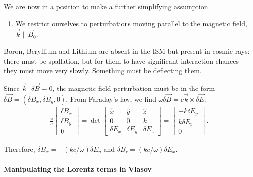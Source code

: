 \documentclass[main.tex]{subfiles}
\begin{document}
We are now in a position to make a further simplifying assumption.

\begin{enumerate}[resume]
    \item We restrict ourselves to perturbations moving parallel to the magnetic field, \(\vec{k} \parallel \vec{B}_0\). 
\end{enumerate}

Boron, Beryllium and Lithium are absent in the ISM but present in cosmic rays: there must be spallation, but for them to have significant interaction chances they must move very slowly. Something must be deflecting them. 

Since \(\vec{k} \cdot \delta \vec{B} = 0\), the magnetic field perturbation must be in the form \(\delta \vec{B} = (\delta B_x, \delta B_y, 0)\). 
From Faraday's law, we find \(\omega \delta \vec{B} = c \vec{k} \times \delta \vec{E}\): 
%
\begin{align}
\frac{\omega}{c} \left[\begin{array}{c}
\delta B_x \\ 
\delta B_y \\ 
0
\end{array}\right]
= \det \left[\begin{array}{ccc}
\hat{x} & \hat{y} & \hat{z} \\ 
0 & 0 & k \\ 
\delta E_x & \delta E_y & \delta E_z
\end{array}\right]
= \left[\begin{array}{c}
- k \delta E_y \\ 
k \delta E_x \\ 
0
\end{array}\right]
\,.
\end{align}

Therefore, \(\delta B_x = - (kc / \omega ) \delta E_y\) and \(\delta B_y = (kc / \omega ) \delta E_x\). 

\paragraph{Manipulating the Lorentz terms in Vlasov}
\end{document}

